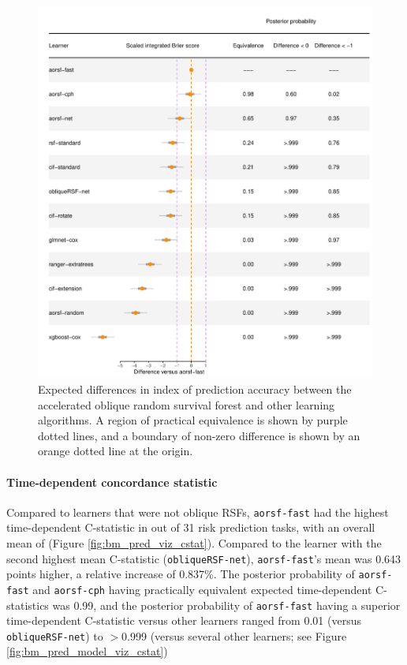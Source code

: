 \documentclass[twoside,11pt]{article}\usepackage[]{graphicx}\usepackage[]{xcolor}
\makeatletter
\def\maxwidth{ %
  \ifdim\Gin@nat@width>\linewidth
    \linewidth
  \else
    \Gin@nat@width
  \fi
}
\newenvironment{knitrout}{}{} %
\makeatother
\begin{document}
\begin{knitrout}
\color{fgcolor}\begin{figure}
\includegraphics[width=\maxwidth]{figure/bm_pred_model_viz_ibs-1} \caption[Expected differences in index of prediction accuracy between the accelerated oblique random survival forest and other learning algorithms]{Expected differences in index of prediction accuracy between the accelerated oblique random survival forest and other learning algorithms. A region of practical equivalence is shown by purple dotted lines, and a boundary of non-zero difference is shown by an orange dotted line at the origin.}\label{fig:bm_pred_model_viz_ibs}
\end{figure}

\end{knitrout}

\paragraph{Time-dependent concordance statistic}




Compared to learners that were not oblique RSFs, \texttt{aorsf-fast} had the highest time-dependent C-statistic in  out of 31 risk prediction tasks, with an overall mean of  (Figure \ref{fig:bm_pred_viz_cstat}). Compared to the learner with the second highest mean C-statistic (\texttt{obliqueRSF-net}), \texttt{aorsf-fast}'s mean was 0.643 points higher, a relative increase of 0.837\%. The posterior probability of \texttt{aorsf-fast} and \texttt{aorsf-cph} having practically equivalent expected time-dependent C-statistics was 0.99, and the posterior probability of \texttt{aorsf-fast} having a superior time-dependent C-statistic versus other learners ranged from 0.01 (versus \texttt{obliqueRSF-net}) to $>$0.999 (versus several other learners; see Figure \ref{fig:bm_pred_model_viz_cstat})
\end{document}
